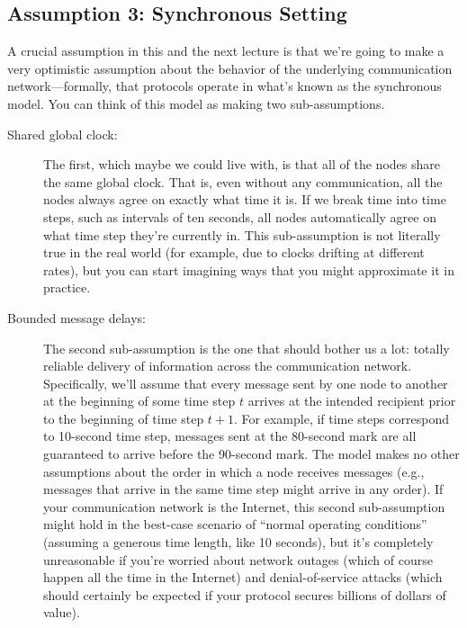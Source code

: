 \subsection{Assumption 3: Synchronous Setting}
A crucial assumption in this and the next lecture is that we’re going to make a very optimistic
assumption about the behavior of the underlying communication network—formally, that protocols operate in what’s known as the synchronous model. You can think of this model
as making two sub-assumptions.
\begin{description}
    \item[Shared global clock:] The first, which maybe we could live with, is that all of the nodes
    share the same global clock. That is, even without any communication, all the nodes always
    agree on exactly what time it is. If we break time into time steps, such as intervals of
    ten seconds, all nodes automatically agree on what time step they’re currently in. This
    sub-assumption is not literally true in the real world (for example, due to clocks drifting at
    different rates), but you can start imagining ways that you might approximate it in practice.
    \item[Bounded message delays:] The second sub-assumption is the one that should bother us
    a lot: totally reliable delivery of information across the communication network. Specifically,
    we’ll assume that every message sent by one node to another at the beginning of some time
    step $t$ arrives at the intended recipient prior to the beginning of time step $t+1$. For example,
    if time steps correspond to 10-second time step, messages sent at the 80-second mark are
    all guaranteed to arrive before the 90-second mark. The model makes no other assumptions
    about the order in which a node receives messages (e.g., messages that arrive in the same
    time step might arrive in any order).
    If your communication network is the Internet, this second sub-assumption might hold in
    the best-case scenario of “normal operating conditions” (assuming a generous time length,
    like 10 seconds), but it’s completely unreasonable if you’re worried about network outages
    (which of course happen all the time in the Internet) and denial-of-service attacks (which
    should certainly be expected if your protocol secures billions of dollars of value).


\end{description}
